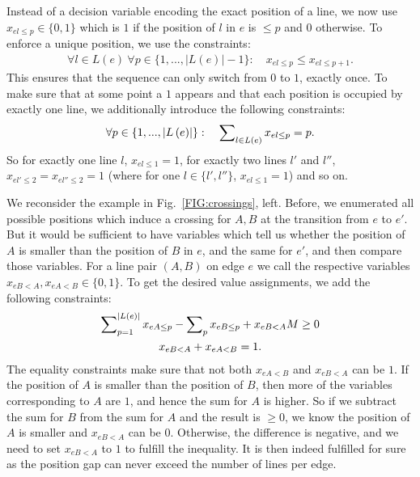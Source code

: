 \documentclass[sigconf]{acmart}
\begin{document}
Instead of a decision variable encoding the exact position of a line, we now use $x_{el\leq p} \in \{0,1\}$ which is $1$ if the position of $l$ in $e$ is $\leq p$ and $0$ otherwise. To enforce a unique position, we use the constraints:
\begin{align}
	\forall l \in L(e)~ \forall p \in \{1, ..., \left|L\left(e\right)\right|-1\}: \quad x_{el\leq p} \leq x_{el\leq p+1}. \label{EQ:up_constr}
\end{align}
This ensures that the sequence can only switch from $0$ to $1$, exactly once. To make sure that at some point a $1$ appears and that each position is occupied by exactly one line, we additionally introduce the following constraints:
\begin{align}
	\forall p \in \{1, ..., \left|L\left(e\right)\right|\}: \quad  \sum\nolimits_{l \in L(e)} x_{el\leq p} = p. \label{EQ:01_constr}
\end{align}
So for exactly one line $l$, $x_{el\leq 1} = 1$, for exactly two lines $l'$ and $l''$, $x_{el'\leq 2} = x_{el''\leq 2} = 1$ (where for one $l \in \{l',l''\}$, $x_{el\leq 1} =1$) and so on.

We reconsider the example in Fig.~\ref{FIG:crossings}, left. Before, we enumerated all possible positions which induce a crossing for $A, B$ at the transition from $e$ to $e'$. But it would be sufficient to have variables which tell us whether the position of $A$ is smaller than the position of $B$ in $e$, and the same for $e'$, and then compare those variables. For a line pair $(A,B)$ on edge $e$ we call the respective variables $x_{eB<A}, x_{eA<B} \in \{0, 1\}$. %
To get the desired value assignments, we add the following constraints:
\begin{gather}
	\sum\nolimits_{p=1}^{\left|L\left(e\right)\right|} x_{eA\leq p} - \sum\nolimits_{p} x_{eB\leq p} + x_{eB<A} M \geq 0 \\
	x_{eB<A} + x_{eA<B}=1.
\end{gather}
The equality constraints make sure that not both $x_{eA<B}$ and $x_{eB<A}$ can be $1$. If the position of $A$ is smaller than the position of $B$, then more of the variables corresponding to $A$ are $1$, and hence the sum for $A$ is higher. So if we subtract the sum for $B$ from the sum for $A$ and the result is $\geq 0$, we know the position of $A$ is smaller and $x_{eB<A}$ can be $0$. Otherwise, the difference is negative, and we need to set $x_{eB<A}$ to $1$ to fulfill the inequality. It is then indeed fulfilled for sure as the position gap can never exceed the number of lines per edge.
\end{document}
